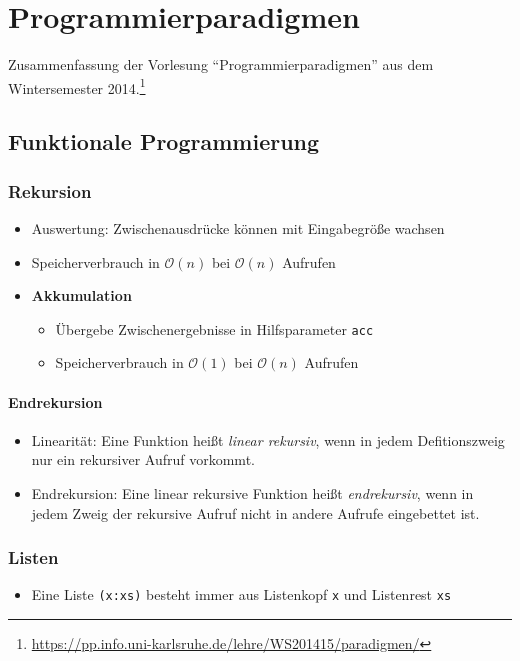 \chapter{Programmierparadigmen}

Zusammenfassung der Vorlesung "`Programmierparadigmen"' aus dem Wintersemester 2014.\footnote{\url{https://pp.info.uni-karlsruhe.de/lehre/WS201415/paradigmen/}}

\section{Funktionale Programmierung}

\subsection{Rekursion}
\begin{itemize}
	\item Auswertung: Zwischenausdrücke können mit Eingabegröße wachsen
	\item Speicherverbrauch in \(\mathcal{O}(n)\) bei \(\mathcal{O}(n)\) Aufrufen
	\item \textbf{Akkumulation}
	\begin{itemize}
		\item Übergebe Zwischenergebnisse in Hilfsparameter \texttt{acc}
		\item Speicherverbrauch in \(\mathcal{O}(1)\) bei \(\mathcal{O}(n)\) Aufrufen
	\end{itemize}
\end{itemize}

\subsubsection{Endrekursion}
\begin{itemize}
	\item Linearität: Eine Funktion heißt \textit{linear rekursiv}, wenn in jedem Defitionszweig nur ein rekursiver Aufruf vorkommt.
	\item Endrekursion: Eine linear rekursive Funktion heißt \textit{endrekursiv}, wenn in jedem Zweig der rekursive Aufruf nicht in andere Aufrufe eingebettet ist.
\end{itemize}


\subsection{Listen}
\begin{itemize}
	\item Eine Liste \texttt{(x:xs)} besteht immer aus Listenkopf \texttt{x} und Listenrest \texttt{xs}
\end{itemize}

